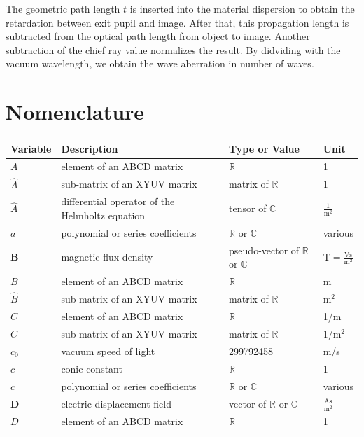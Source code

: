 \documentclass[12pt,a4paper,twoside,openright,BCOR10mm,headsepline,titlepage,abstracton,chapterprefix,final]{scrreprt}
\newcommand\Vector[1]{{\mathbf{#1}}}
\newcommand\vacuum{0}
\newcommand\scalarBfield{B}
\newcommand\scalarDfield{D}
\newcommand\Bfield{\Vector{\scalarBfield}}
\newcommand\Dfield{\Vector{\scalarDfield}}
\newcommand\meter{\textrm{m}}
\newcommand\second{\textrm{s}}
\newcommand\ampere{\textrm{A}}
\newcommand\volt{\textrm{V}}
\newcommand\tesla{\textrm{T}}
\begin{document}
The geometric path length $t$ is inserted into the material dispersion to obtain the retardation between exit pupil and image. After that, this propagation length is subtracted from the optical path length from object to image.
Another subtraction of the chief ray value normalizes the result.
By didviding with the vacuum wavelength, we obtain the wave aberration in number of waves.







\chapter{Nomenclature}
\begin{tabular}{l|l|l|l}
 Variable & Description & Type or Value & Unit \\
 \hline
 $A$ & element of an ABCD matrix & $\mathbb{R}$ & 1 \\
 $\hat{A}$ & sub-matrix of an XYUV matrix & matrix of $\mathbb{R}$ & 1 \\
 $\hat{A}$ & differential operator of the Helmholtz equation & tensor of $\mathbb{C}$ & $\frac{1}{\meter^2}$\\
 $a$ & polynomial or series coefficients & $\mathbb{R}$ or $\mathbb{C}$ & various\\
 \hline
 $\Bfield$ & magnetic flux density & pseudo-vector of $\mathbb{R}$ or $\mathbb{C}$ & $\tesla = \frac{\volt\second}{\meter^2} $\\
 $B$ & element of an ABCD matrix & $\mathbb{R}$ & \meter \\
 $\hat{B}$ & sub-matrix of an XYUV matrix & matrix of $\mathbb{R}$ & $\meter^2$ \\
 \hline
 $C$ & element of an ABCD matrix & $\mathbb{R}$ & 1/\meter\\
 $\hat{C}$ & sub-matrix of an XYUV matrix & matrix of $\mathbb{R}$ & 1/$\meter^2$\\
 $c_\vacuum$ & vacuum speed of light & 299792458 & \meter /\second \\
 $c$ & conic constant & $\mathbb{R}$ & 1 \\
 $c$ & polynomial or series coefficients & $\mathbb{R}$ or $\mathbb{C}$ & various\\
 \hline
 $\Dfield$ & electric displacement field & vector of $\mathbb{R}$ or $\mathbb{C}$ & $\frac{\ampere \second}{\meter^2}$\\
 $D$ & element of an ABCD matrix & $\mathbb{R}$ & 1\\

\end{tabular}
\end{document}
